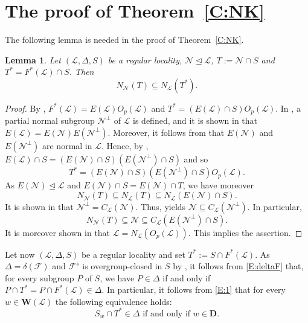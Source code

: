 \documentclass[reqno,11pt]{amsart}
\numberwithin{equation}{section}
\newtheorem{lemma}[theorem]{Lemma}
\theoremstyle{definition}
\newcommand{\F}{\mathcal{F}}
\renewcommand{\L}{\mathcal{L}}
\newcommand{\N}{\mathcal{N}}
\newcommand{\D}{\mathbf{D}}
\newcommand{\W}{\mathbf{W}}
\begin{document}
\section{The proof of Theorem~\ref{C:NK}}



The following lemma is needed in the proof of Theorem~\ref{C:NK}.


\begin{lemma}\label{E:3prime}
Let $(\L,\Delta,S)$ be a regular locality, $\N\unlhd\L$, $T:=\N\cap S$ and $T^*=F^*(\L)\cap S$. Then
\[N_\N(T)\subseteq N_\L(T^*).\]
\end{lemma}

\begin{proof}
By \cite[Lemma~11.9]{Henke:Regular}, $F^*(\L)=E(\L)O_p(\L)$ and $T^*=(E(\L)\cap S)O_p(\L)$. In \cite[Notation~5.12]{Henke:Regular}, a partial normal subgroup $\N^\perp$ of $\L$ is defined, and it is shown in \cite[Lemma~11.16]{Henke:Regular} that $E(\L)=E(\N)E(\N^\perp)$. Moreover, it follows from \cite[Lemma~11.13]{Henke:Regular} that $E(\N)$ and $E(\N^\perp)$ are normal in $\L$. Hence, by \cite[Theorem~1]{Henke:2015a}, $E(\L)\cap S=(E(\N)\cap S)(E(\N^\perp)\cap S)$ and so
\[T^*=(E(\N)\cap S)(E(\N^\perp)\cap S)O_p(\L).\]
As $E(\N)\unlhd\L$ and $E(\N)\cap S=E(\N)\cap T$, we have moreover
\[N_\N(T)\subseteq N_\L(T)\subseteq N_\L(E(\N)\cap S).\]
It is shown in \cite[Theorem~10.16(e)]{Henke:Regular} that $\N^\perp=C_\L(\N)$.  Thus, \cite[Lemma~3.5]{Henke:Regular} yields $\N\subseteq C_\L(\N^\perp)$. In particular,
\[N_\N(T)\subseteq \N\subseteq C_\L(E(\N^\perp)\cap S).\]
It is moreover shown in \cite[Lemma~3.13]{Henke:Regular} that $\L=N_\L(O_p(\L))$. This implies the assertion.
\end{proof}

Let now $(\L,\Delta,S)$ be a regular locality and set $T^*:=S\cap F^*(\L)$. As $\Delta=\delta(\F)$ and $\F^s$ is overgroup-closed in $S$ by \cite[Proposition~3.3]{Henke:2015}, it follows from \eqref{E:deltaF} that, for every subgroup $P$ of $S$, we have $P\in\Delta$ if and only if $P\cap T^*=P\cap F^*(\L)\in\Delta$. In particular, it follows from \eqref{E:1} that for every $w\in\W(\L)$ the following equivalence holds:
\begin{equation}\label{E:SwcapT*}
S_w\cap T^*\in\Delta\mbox{ if and only if }w\in\D.
\end{equation}
\end{document}
